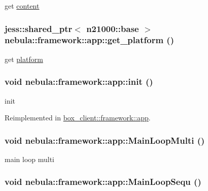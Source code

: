 get \hyperlink{namespacenebula_1_1content}{content} \hypertarget{classnebula_1_1framework_1_1app_a8f371e95cba208017eb9633b1f7466b2}{
\subsubsection[{get\_\-platform}]{\setlength{\rightskip}{0pt plus 5cm}jess::shared\_\-ptr$<$ {\bf n21000::base} $>$ nebula::framework::app::get\_\-platform ()}}
\label{classnebula_1_1framework_1_1app_a8f371e95cba208017eb9633b1f7466b2}


get \hyperlink{namespacenebula_1_1platform}{platform} \hypertarget{classnebula_1_1framework_1_1app_a8ec897736c54f5ee32f4b9827ac403fa}{
\subsubsection[{init}]{\setlength{\rightskip}{0pt plus 5cm}void nebula::framework::app::init ()}}
\label{classnebula_1_1framework_1_1app_a8ec897736c54f5ee32f4b9827ac403fa}


init 

Reimplemented in \hyperlink{classbox__client_1_1framework_1_1app_ad7d207b90de357901f98ec1849b6d296}{box\_\-client::framework::app}.\hypertarget{classnebula_1_1framework_1_1app_a154c3febb4ff453b5363c7036f259441}{
\subsubsection[{MainLoopMulti}]{\setlength{\rightskip}{0pt plus 5cm}void nebula::framework::app::MainLoopMulti ()}}
\label{classnebula_1_1framework_1_1app_a154c3febb4ff453b5363c7036f259441}


main loop multi \hypertarget{classnebula_1_1framework_1_1app_a1ef5e4a11817d1c6856060b60cd622ef}{
\subsubsection[{MainLoopSequ}]{\setlength{\rightskip}{0pt plus 5cm}void nebula::framework::app::MainLoopSequ ()}}
\label{classnebula_1_1framework_1_1app_a1ef5e4a11817d1c6856060b60cd622ef}


